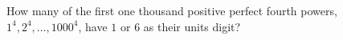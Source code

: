 How many of the first one thousand positive perfect fourth powers, $1^4,2^4,\dots,1000^4$, have $1$ or $6$ as their units digit?
